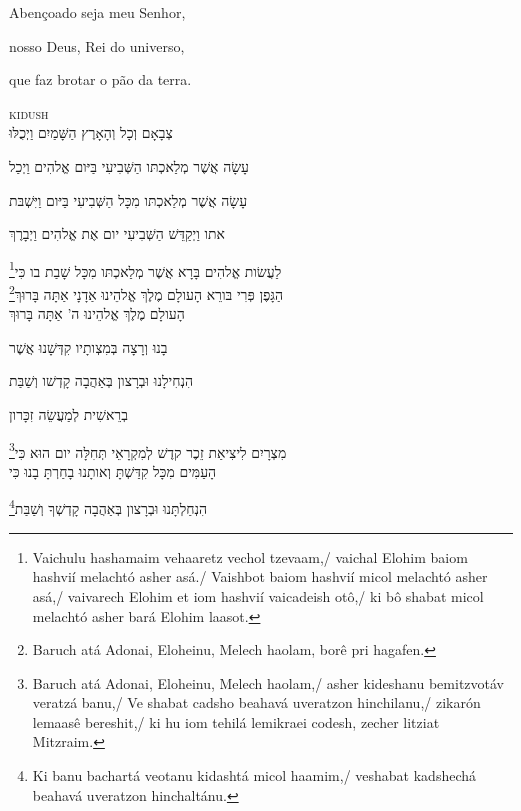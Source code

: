Abençoado seja meu Senhor,

nosso Deus, Rei do universo,

que faz brotar o pão da terra.


\movetoevenpage
\raggedleft


\vspace*{1cm}

\textsc{kidush}\\[15pt]

צְבָאָם וְכָל וְהָאָרֶץ הַשָּׁמַיִם וַיְכֻלּוּ 

עָשָׂה אֲשֶׁר מְלַאכְתּו הַשְּׁבִיעִי בַּיּום אֱלהִים וַיְכַל 

עָשָׂה אֲשֶׁר מְלַאכְתּו מִכָּל הַשְּׁבִיעִי בַּיּום וַיִּשְׁבּת 

אתו וַיְקַדֵּשׁ הַשְּׁבִיעִי יום אֶת אֱלהִים וַיְבָרֶךְ 

\footnote{Vaichulu hashamaim vehaaretz vechol tzevaam,/ vaichal Elohim baiom hashvií melachtó asher asá./ Vaishbot baiom hashvií micol melachtó asher asá,/ vaivarech Elohim et iom hashvií vaicadeish otô,/ ki bô shabat micol melachtó asher bará Elohim laasot.}לַעֲשׂות אֱלהִים בָּרָא אֲשֶׁר מְלַאכְתּו מִכָּל שָׁבַת בו כִּי\\[10pt] 

\footnote{Baruch atá Adonai, Eloheinu, Melech haolam, borê pri hagafen.}הַגָּפֶן פְּרִי בּורֵא הָעולָם מֶלֶךְ אֱלהֵינוּ אַדָנָי אַתָּה בָּרוּךְ\\[10pt] 

הָעולָם מֶלֶךְ אֱלהֵינוּ ה' אַתָּה בָּרוּךְ

בָנוּ וְרָצָה בְּמִצְותָיו קִדְּשָׁנוּ אֲשֶׁר

הִנְחִילָנוּ וּבְרָצון בְּאַהֲבָה קָדְשׁו וְשַׁבַּת

בְרֵאשִׁית לְמַעֲשֵׂה זִכָּרון

\footnote{Baruch atá Adonai, Eloheinu, Melech haolam,/ asher kideshanu bemitzvotáv veratzá banu,/ Ve shabat cadsho beahavá uveratzon hinchilanu,/ zikarón lemaasê bereshit,/ ki hu iom tehilá lemikraei codesh, zecher litziat Mitzraim.}מִצְרָיִם לִיצִיאַת זֵכֶר קדֶשׁ לְמִקְרָאֵי תְּחִלָּה יום הוּא כִּי\\[10pt]

הָעַמִּים מִכָּל קִדַּשְׁתָּ וְאותָנוּ בָחַרְתָּ בָנוּ כִּי

\footnote{Ki banu bachartá veotanu kidashtá micol haamim,/ veshabat kadshechá beahavá uveratzon hinchaltánu.}הִנְחַלְתָּנוּ וּבְרָצון בְּאַהֲבָה קָדְשְׁךָ וְשַׁבַּת \\[10pt]


